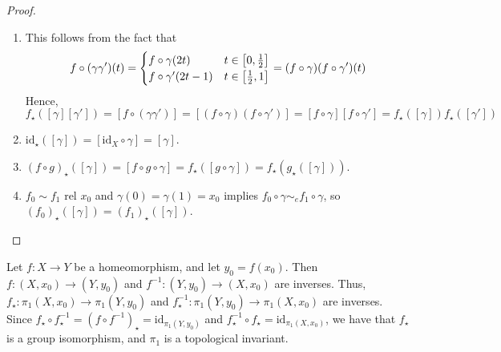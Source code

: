 \begin{proof}
	\begin{enumerate}
		\item This follows from the fact that
			\[ f \circ (\gamma\gamma')(t) = \begin{cases}
				f \circ \gamma(2t) & t \in \qty[0,\frac 12] \\
				f \circ \gamma'(2t-1) & t \in \qty[\frac 12, 1]
			\end{cases} = (f \circ \gamma)(f \circ \gamma')(t) \]
			Hence,
			\[ f_\star([\gamma][\gamma']) = [f\circ(\gamma\gamma')] = [(f\circ \gamma)(f \circ \gamma')] = [f \circ \gamma][f \circ \gamma'] = f_\star([\gamma]) f_\star([\gamma']) \]
		\item \( \mathrm{id}_\star([\gamma]) = [\mathrm{id}_X\circ \gamma] = [\gamma] \).
		\item \( (f \circ g)_\star([\gamma]) = [f \circ g \circ \gamma] = f_\star([g \circ \gamma]) = f_\star(g_\star([\gamma])) \).
		\item \( f_0 \sim f_1 \text{ rel } x_0 \) and \( \gamma(0) = \gamma(1) = x_0 \) implies \( f_0 \circ \gamma \sim_e f_1 \circ \gamma \), so \( (f_0)_\star([\gamma]) = (f_1)_\star([\gamma]) \).
	\end{enumerate}
\end{proof}
\begin{example}
	Let \( f \colon X \to Y \) be a homeomorphism, and let \( y_0 = f(x_0) \).
	Then \( f \colon (X, x_0) \to (Y, y_0) \) and \( f^{-1} \colon (Y, y_0) \to (X, x_0) \) are inverses.
	Thus, \( f_\star \colon \pi_1(X, x_0) \to \pi_1(Y, y_0) \) and \( f^{-1}_\star \colon \pi_1(Y, y_0) \to \pi_1(X, x_0) \) are inverses.
	Since \( f_\star \circ f^{-1}_\star = (f \circ f^{-1})_\star = \mathrm{id}_{\pi_1(Y,y_0)} \) and \( f^{-1}_\star \circ f_\star = \mathrm{id}_{\pi_1(X,x_0)} \), we have that \( f_\star \) is a group isomorphism, and \( \pi_1 \) is a topological invariant.
\end{example}

